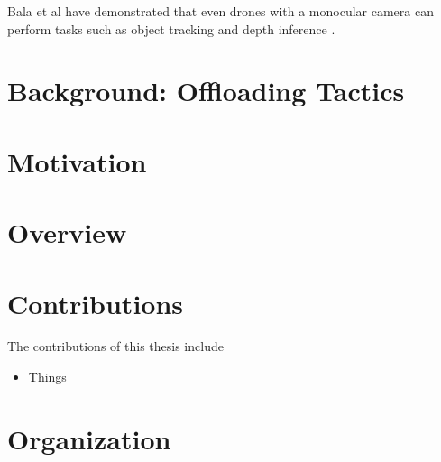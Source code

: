 Bala et al have demonstrated that even drones with a monocular camera can
perform tasks such as object tracking and depth inference \cite{bala2024}.

\section{Background: Offloading Tactics}

\section{Motivation}


\section{Overview}


\section{Contributions}

The contributions of this thesis include
\begin{itemize}
  \item Things
\end{itemize}


\section{Organization}
